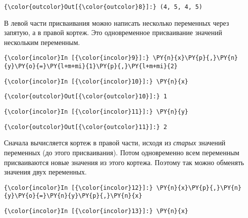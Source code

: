             \begin{Verbatim}[commandchars=\\\{\}]
{\color{outcolor}Out[{\color{outcolor}8}]:} (4, 5, 4, 5)
\end{Verbatim}
        
    В левой части присваивания можно написать несколько переменных через
запятую, а в правой кортеж. Это одновременное присваивание значений
нескольким переменным.

    \begin{Verbatim}[commandchars=\\\{\}]
{\color{incolor}In [{\color{incolor}9}]:} \PY{n}{x}\PY{p}{,}\PY{n}{y}\PY{o}{=}\PY{l+m+mi}{1}\PY{p}{,}\PY{l+m+mi}{2}
\end{Verbatim}

    \begin{Verbatim}[commandchars=\\\{\}]
{\color{incolor}In [{\color{incolor}10}]:} \PY{n}{x}
\end{Verbatim}

            \begin{Verbatim}[commandchars=\\\{\}]
{\color{outcolor}Out[{\color{outcolor}10}]:} 1
\end{Verbatim}
        
    \begin{Verbatim}[commandchars=\\\{\}]
{\color{incolor}In [{\color{incolor}11}]:} \PY{n}{y}
\end{Verbatim}

            \begin{Verbatim}[commandchars=\\\{\}]
{\color{outcolor}Out[{\color{outcolor}11}]:} 2
\end{Verbatim}
        
    Сначала вычисляется кортеж в правой части, исходя из \emph{старых}
значений переменных (до этого присваивания). Потом одновременно всем
переменным присваиваются новые значения из этого кортежа. Поэтому так
можно обменять значения двух переменных.

    \begin{Verbatim}[commandchars=\\\{\}]
{\color{incolor}In [{\color{incolor}12}]:} \PY{n}{x}\PY{p}{,}\PY{n}{y}\PY{o}{=}\PY{n}{y}\PY{p}{,}\PY{n}{x}
\end{Verbatim}

    \begin{Verbatim}[commandchars=\\\{\}]
{\color{incolor}In [{\color{incolor}13}]:} \PY{n}{x}
\end{Verbatim}

